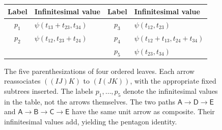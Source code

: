 \begin{figure}[!t]
  \smallskip
  {\small
  \begin{tabular}{@{}cl@{\qquad}cl@{}}
    \toprule
    Label & Infinitesimal value & Label & Infinitesimal value \\
    \midrule
    $p_1$ & $\psi(t_{13}+t_{23},t_{34})$
      & $p_3$ & $\psi(t_{12},t_{23})$ \\
    $p_2$ & $\psi(t_{12},t_{23}+t_{24})$
      & $p_4$ & $\psi(t_{12}+t_{13},t_{24}+t_{34})$ \\
    & & $p_5$ & $\psi(t_{23},t_{34})$ \\
    \bottomrule
  \end{tabular}}
  \caption{The five parenthesizations of four ordered leaves. Each arrow
  reassociates $((IJ)K)$ to $(I(JK))$, with the appropriate fixed subtrees
  inserted. The labels $p_1,\ldots,p_5$ denote the infinitesimal values
  in the table, not the arrows themselves.
  The two paths $\mathsf{A}\to\mathsf{D}\to\mathsf{E}$ and
  $\mathsf{A}\to\mathsf{B}\to\mathsf{C}\to\mathsf{E}$ have the same unit
  arrow as composite. Their infinitesimal values add, yielding the pentagon
  identity.}
  \label{fig:reassociation}
\end{figure}
